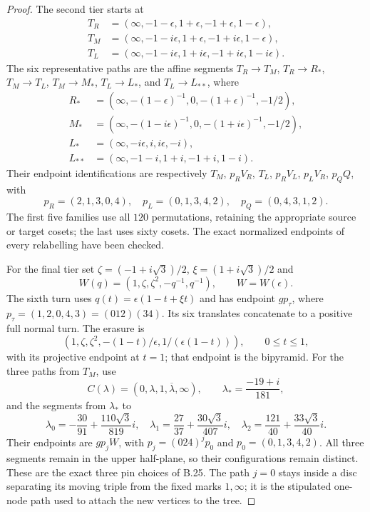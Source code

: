 \begin{proof}
The second tier starts at
\[
\begin{split}
 T_R&=(\infty,-1-\epsilon,1+\epsilon,-1+\epsilon,1-\epsilon),\\
 T_M&=(\infty,-1-i\epsilon,1+\epsilon,-1+i\epsilon,1-\epsilon),\\
 T_L&=(\infty,-1-i\epsilon,1+i\epsilon,-1+i\epsilon,1-i\epsilon).
\end{split}
\]
The six representative paths are the affine segments
$T_R\to T_M$, $T_R\to R_*$, $T_M\to T_L$,
$T_M\to M_*$, $T_L\to L_*$, and $T_L\to L_{**}$, where
\[
\begin{split}
 R_*&=(\infty,-(1-\epsilon)^{-1},0,-(1+\epsilon)^{-1},-1/2),\\
 M_*&=(\infty,-(1-i\epsilon)^{-1},0,-(1+i\epsilon)^{-1},-1/2),\\
 L_*&=(\infty,-i\epsilon,i,i\epsilon,-i),\\
 L_{**}&=(\infty,-1-i,1+i,-1+i,1-i).
\end{split}
\]
Their endpoint identifications are respectively $T_M$, $p_RV_R$,
$T_L$, $p_RV_L$, $p_LV_R$, $p_QQ$, with
\[
 p_R=(2,1,3,0,4),\quad p_L=(0,1,3,4,2),\quad p_Q=(0,4,3,1,2).
\]
The first five families use all $120$ permutations, retaining the
appropriate source or target cosets; the last uses sixty cosets.
The exact normalized endpoints of every relabelling have been checked.

For the final tier set $\zeta=(-1+i\sqrt3)/2$,
$\xi=(1+i\sqrt3)/2$ and
\[
 W(q)=(1,\zeta,\zeta^2,-q^{-1},q^{-1}),\qquad W=W(\epsilon).
\]
The sixth turn uses $q(t)=\epsilon(1-t+\xi t)$ and has endpoint
$gp_\tau$, where $p_\tau=(1,2,0,4,3)=(012)(34)$.
Its six translates concatenate to a positive full normal turn.
The erasure is
\[
 (1,\zeta,\zeta^2,-(1-t)/\epsilon,
                         1/(\epsilon(1-t))),
                     \qquad0\leq t\leq1,
\]
with its projective endpoint at $t=1$; that endpoint is the bipyramid.
For the three paths from $T_M$, use
\[
 C(\lambda)=(0,\lambda,1,\overline\lambda,\infty),\qquad
 \lambda_*=\frac{-19+i}{181},
\]
and the segments from $\lambda_*$ to
\[
 \lambda_0=-\frac{30}{91}+\frac{110\sqrt3}{819}i,
 \quad\lambda_1=\frac{27}{37}+\frac{30\sqrt3}{407}i,
 \quad\lambda_2=\frac{121}{40}+\frac{33\sqrt3}{40}i.
\]
Their endpoints are $gp_jW$, with $p_j=(024)^jp_0$ and
$p_0=(0,1,3,4,2)$.  All three segments remain in the upper half-plane,
so their configurations remain distinct.  These are the exact three
pin choices of B.25.  The path $j=0$ stays inside a disc separating
its moving triple from the fixed marks $1,\infty$; it is the stipulated
one-node path used to attach the new vertices to the tree.


\end{proof}
